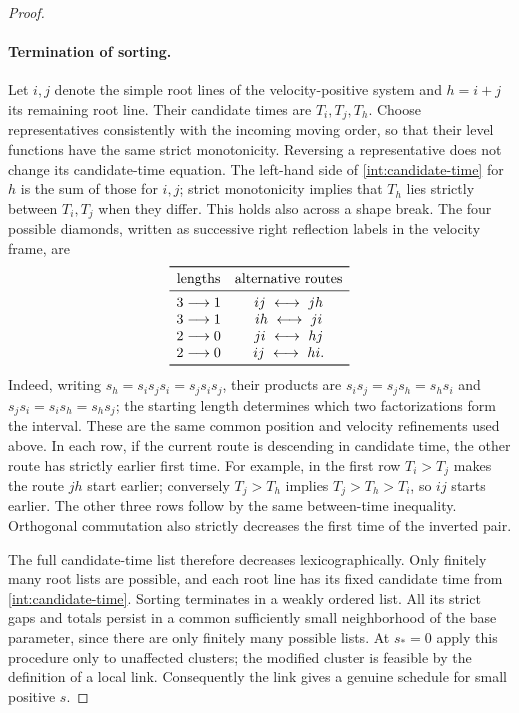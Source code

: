 \begin{proof}
\paragraph{Termination of sorting.}
Let \(i,j\) denote the simple root lines of the velocity-positive
system and \(h=i+j\) its remaining root line.  Their candidate times
are \(T_i,T_j,T_h\).  Choose representatives consistently with the
incoming moving order, so that their level functions have the same
strict monotonicity.  Reversing a representative does not change its
candidate-time equation.  The left-hand side of
\eqref{int:candidate-time} for \(h\) is the sum of those for \(i,j\);
strict monotonicity implies that \(T_h\) lies strictly between
\(T_i,T_j\) when they differ.  This holds also across a shape break.
The four possible diamonds, written as successive right reflection
labels in the velocity frame, are
\[
\begin{array}{cc}
\toprule
\text{lengths}&\text{alternative routes}\\ \midrule
3\longrightarrow1&ij\ \longleftrightarrow\ jh\\
3\longrightarrow1&ih\ \longleftrightarrow\ ji\\
2\longrightarrow0&ji\ \longleftrightarrow\ hj\\
2\longrightarrow0&ij\ \longleftrightarrow\ hi.\\
\bottomrule
\end{array}
\]
Indeed, writing \(s_h=s_i s_j s_i=s_j s_i s_j\), their products are
\(s_i s_j=s_j s_h=s_h s_i\) and
\(s_j s_i=s_i s_h=s_h s_j\); the starting length determines which
two factorizations form the interval.  These are the same common
position and velocity refinements used above.
In each row, if the current route is descending in candidate time, the
other route has strictly earlier first time.  For example, in the
first row \(T_i>T_j\) makes the route \(jh\) start earlier; conversely
\(T_j>T_h\) implies \(T_j>T_h>T_i\), so \(ij\) starts earlier.
The other three rows follow by the same between-time inequality.
Orthogonal commutation also strictly decreases the first time of the
inverted pair.

The full candidate-time list therefore decreases lexicographically.
Only finitely many root lists are possible, and each root line has its
fixed candidate time from \eqref{int:candidate-time}.  Sorting
terminates in a weakly ordered list.  All its strict gaps and totals
persist in a common sufficiently small neighborhood of the base
parameter, since there are only finitely many possible lists.
At \(s_*=0\) apply this procedure only to unaffected clusters; the
modified cluster is feasible by the definition of a local link.
Consequently the link gives a genuine schedule for small positive
\(s\).


\end{proof}
